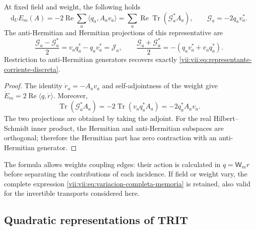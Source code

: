 \begin{proposition}
\label{vii:vii:prop:diferencial-invertible}
At fixed field and weight, the following holds
\begin{equation}
 \mathrm d_UE_m(A)=-2\operatorname{Re}\sum_a
       \langle q_a,A_av_a\rangle
 =\sum_a\operatorname{Re}\operatorname{Tr}(\mathcal G_a^*A_a),
 \qquad \mathcal G_a=-2q_av_a^*.
 \label{vii:vii:eq:gradiente-transporte-completo}
\end{equation}
The anti-Hermitian and Hermitian projections of this representative are
\begin{equation}
 \frac{\mathcal G_a-\mathcal G_a^*}{2}
   =v_aq_a^*-q_av_a^*=\mathcal J_a,
 \qquad
 \frac{\mathcal G_a+\mathcal G_a^*}{2}
   =-(q_av_a^*+v_aq_a^*).
 \label{vii:vii:eq:proyecciones-gradiente-memoria}
\end{equation}
Restriction to anti-Hermitian generators recovers exactly
\eqref{vii:vii:eq:representante-corriente-discreta}.
\end{proposition}

\begin{proof}
The identity \(\dot r_a=-A_av_a\) and self-adjointness of the weight give
\(\dot E_m=2\operatorname{Re}\langle q,\dot r\rangle\).
Moreover,
\[
 \operatorname{Tr}(\mathcal G_a^*A_a)
 =-2\operatorname{Tr}(v_aq_a^*A_a)=-2q_a^*A_av_a.
\]
The two projections are obtained by taking the adjoint. For the real
Hilbert--Schmidt inner product, the Hermitian and anti-Hermitian subspaces are
orthogonal; therefore the Hermitian part has zero contraction with
an anti-Hermitian generator.
\end{proof}

The formula allows weights coupling edges: their action is calculated in
\(q=\mathsf W_mr\) before separating the contributions of each
incidence. If field or weight vary, the complete expression
\eqref{vii:vii:eq:variacion-completa-memoria} is retained, also valid for the
invertible transports considered here.

\subsection{Quadratic representations of TRIT}


